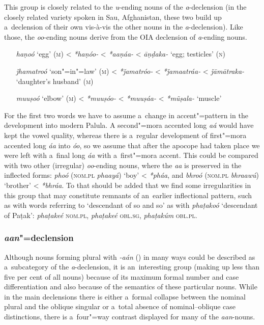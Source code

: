  
This group is closely related to the \textit{u}-ending nouns of the \textit{a}-declension (in the closely related variety spoken in Sau, Afghanistan, these two build up a~declension of their own vis-à-vis the other nouns in the \textit{a}-declension). Like those, the \textit{oo}-ending nouns derive from the OIA declension of \textit{a}-ending nouns. 


\begin{itemize}[leftmargin=]
\item[\textit{haṇoó} `egg' (\textsc{m})] {\textless} \textit{*haṇóo-} {\textless} \textit{*aaṇáa-} {\textless} \textit{āṇḍaka-} `egg; testicles' (\textsc{n})
\item[\textit{ǰhamatroó} `son"=in"=law' (\textsc{m})] {\textless} \textit{*ǰamatróo-} {\textless} \textit{*ǰamaatráa-} {\textless} \textit{ǰāmātraka-} `daughter's husband' (\textsc{m})
\item[\textit{muuṣoó} `elbow' (\textsc{m})] {\textless} \textit{*muuṣóo-} {\textless} \textit{*muuṣáa-} {\textless} \textit{*mũṣala-} `muscle'
\end{itemize}

For the first two words we have to assume a~change in accent"=pattern in the development into modern Palula. A second"=mora accented long \textit{aá} would have kept the vowel quality, whereas there is a~regular development of first"=mora accented long \textit{áa} into \textit{óo}, so we assume that after the apocope had taken place we were left with a~final long \textit{áa} with a~first"=mora accent. This could be compared with two other (irregular) \textit{oo}-ending nouns, where the \textit{aa} is preserved in the inflected forms: \textit{phoó} (\textsc{nom.pl} \textit{phaayá}) `boy' {\textless} \textit{*pháa}, and \textit{bhroó} (\textsc{nom.pl} \textit{bhraawú}) `brother' {\textless} \textit{*bhráa}. To that should be added that we find some irregularities in this group that may constitute remnants of an~earlier inflectional pattern, such as with words referring to `descendant of so and so' as with \textit{phaṭakoó} `descendant of Paṭak': \textit{phaṭakeé} \textsc{nom.pl}, \textit{phaṭakeé} \textsc{obl.sg}, \textit{phaṭakúm} \textsc{obl.pl}.

\subsubsection*{\textit{aan}"=declension}

Although nouns forming plural with \textit{-aán} () in many ways could be described as a~subcategory of the \textit{a}-declension, it is an~interesting group (making up less than five per cent of all nouns) because of its maximum formal number and case differentiation and also because of the semantics of these particular nouns. While in the main declensions there is either a~formal collapse between the nominal plural and the oblique singular or a~total absence of nominal--oblique case distinctions, there is a~four"=way contrast displayed for many of the \textit{aan}-nouns.


